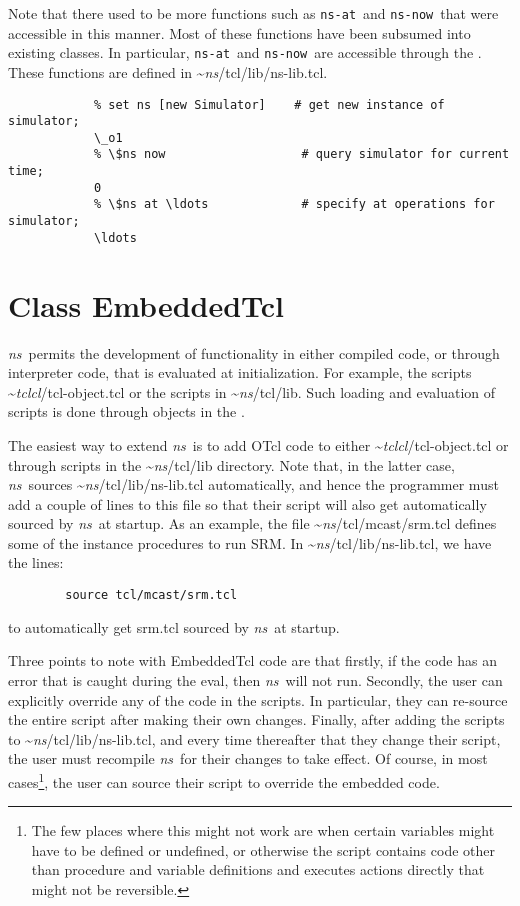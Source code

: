 Note that there used to be more functions such as {\tt ns-at}\ and
{\tt ns-now}\ that were accessible in this manner.
Most of these functions have been subsumed into existing classes.
In particular, {\tt ns-at}\ and {\tt ns-now}\ are accessible
through the
.
These functions are defined in \textasciitilde\emph{ns}/{tcl/lib/ns-lib.tcl}.
\begin{verbatim}
            % set ns [new Simulator]    # get new instance of simulator;
            \_o1
            % \$ns now                   # query simulator for current time;
            0
            % \$ns at \ldots             # specify at operations for simulator;
            \ldots
\end{verbatim}
          

\section{Class EmbeddedTcl}
\label{sec:EmbeddedTcl}

\emph{ns}\ permits the development of functionality in either compiled code,
or through interpreter code, that is evaluated at initialization.
For example, the scripts \textasciitilde\emph{tclcl}/{tcl-object.tcl} or the scripts in
\textasciitilde\emph{ns}/{tcl/lib}.
Such loading and evaluation of scripts is done through objects in the
.

The easiest way to extend \emph{ns}\ is to add OTcl code
to either \textasciitilde\emph{tclcl}/{tcl-object.tcl} or through scripts
in the \textasciitilde\emph{ns}/{tcl/lib} directory.
Note that, in the latter case, \emph{ns}\ sources
\textasciitilde\emph{ns}/{tcl/lib/ns-lib.tcl} automatically, and hence
the programmer must add a couple of lines to this file
so that their script will also get automatically sourced by \emph{ns}\
at startup.
As an example,
the file \textasciitilde\emph{ns}/{tcl/mcast/srm.tcl} defines some of the instance procedures
to run SRM.
In \textasciitilde\emph{ns}/{tcl/lib/ns-lib.tcl}, we have the lines:
\begin{verbatim}
        source tcl/mcast/srm.tcl
\end{verbatim}
to automatically get srm.tcl sourced by \emph{ns}\ at startup.

Three points to note with EmbeddedTcl code are that
firstly, if the code has an error that is caught during the eval,
then \emph{ns}\ will not run.
Secondly, the user can explicitly override any of the code in the scripts.
In particular, they can re-source the entire script after making their own
changes. 
Finally, after adding the scripts to \textasciitilde\emph{ns}/{tcl/lib/ns-lib.tcl}, and
every time thereafter that they change their script, the user
must recompile \emph{ns}\ for their changes to take effect.
Of course, in most cases\footnote{%
The few places where this might not work
are when certain variables might have to be defined or undefined,
or otherwise the script contains code
other than procedure and variable definitions and 
executes actions directly that might not be reversible.},
the user can source their script
to override the embedded code.


